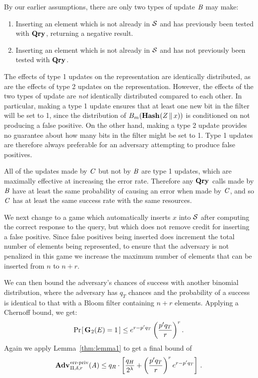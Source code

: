 By our earlier assumptions, there are only two types of update $\mathit{B}$ may make:
%
\begin{enumerate}
  \item Inserting an element which is not already in $\mathcal{S}$ and has previously been tested with $\textup{\textbf{Qry}}\hspace{0.5pt}$, returning a negative result.
  \item Inserting an element which is not already in $\mathcal{S}$ and has not previously been tested with $\textup{\textbf{Qry}}\hspace{0.5pt}$.
\end{enumerate}
The effects of type 1 updates
on the representation are identically distributed, as are the effects of type 2 updates on
the representation. However, the effects of the
two types of update are \emph{not} identically distributed compared to each
other. In particular, making a type 1 update ensures that at least one new bit
in the filter will be set to 1, since the distribution of
${B}_m(\textup{\textbf{Hash}}\hspace{0.5pt}(Z \, \| \, x))$ is conditioned on not producing a false
positive. On the other hand, making a type 2 update provides no guarantee about
how many bits in the filter might be set to 1. Type 1 updates are therefore
always preferable for an adversary attempting to produce false positives. %

All of the updates made by $\mathit{C}$ but not
by $\mathit{B}$ are type 1 updates, which are maximally effective at increasing the
error rate. Therefore any $\textup{\textbf{Qry}}\hspace{0.5pt}$ calls made by $\mathit{B}$ have at least the same
probability of causing an error when made by $\mathit{C}$, and so
$\mathit{C}$ has at least the same success rate with the same resources.

We next change to a game which
automatically inserts $x$ into $\mathcal{S}$ after computing the correct response to the
query, but which does not remove credit for inserting a false positive. Since false
positives being inserted does increment the total number of elements being
represented, to ensure that the adversary is not penalized in this game we
increase the maximum number of elements that can be inserted from $n$ to $n+r$.

We can then bound the adversary's chances of success with another binomial
distribution, where the adversary has $q_T$ chances and the probability of a
success is identical to that with a Bloom filter containing $n+r$ elements.
Applying a Chernoff bound, we get:
\begin{equation}
   \Pr\hspace{-1pt}\left[\,\textup{\textbf{G}}\hspace{0.5pt}_2(E)=1\,\right] \le
     e^{r-p'q_T}\left(\frac{p'q_T}{r}\right)^r.
\end{equation}
%
Again we apply Lemma~\ref{thm:lemma1} to get a final bound of
\begin{equation}
  \Adv{\erreps}_{\Pi,\delta,r}(\advA) \leq
    q_R \cdot \left[
      \frac{q_H}{2^\lambda} +
      \left(\frac{p'q_T}{r}\right)^re^{r-p'q_T}
    \right] \,.
\end{equation}

